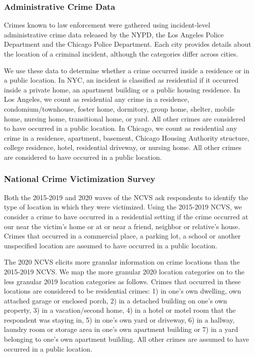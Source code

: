\subsubsection{Administrative Crime Data}
Crimes known to law enforcement were gathered using incident-level administrative crime data released by the NYPD, the Los Angeles Police Department and the Chicago Police Department. Each city provides details about the location of a criminal incident, although the categories differ across cities. 

We use these data to determine whether a crime occurred inside a residence or in a public location.  In NYC, an incident is classified as residential if it occurred inside a private home, an apartment building or a public housing residence. In Los Angeles, we count as residential any crime in a residence, condomium/townhouse, foster home, dormitory, group home, shelter, mobile home, nursing home, transitional home, or yard. All other crimes are considered to have occurred in a public location. In Chicago, we count as residential any crime in a residence, apartment, basement, Chicago Housing Authority structure, college residence, hotel, residential driveway, or nursing home. All other crimes are considered to have occurred in a public location. 

\subsubsection{National Crime Victimization Survey}
Both the 2015-2019 and 2020 waves of the NCVS ask respondents to identify the type of location in which they were victimized. Using the 2015-2019 NCVS, we consider a crime to have occurred in a residential setting if the crime occurred at our near the victim's home or at or near a friend, neighbor or relative's house. Crimes that occurred in a commercial place, a parking lot, a school or another unspecified location are assumed to have occurred in a public location. 

The 2020 NCVS elicits more granular information on crime locations than the 2015-2019 NCVS.  We map the more granular 2020 location categories on to the less granular 2019 location categories as follows. Crimes that occurred in these locations are considered to be residential crimes: 1) in one's own dwelling, own attached garage or enclosed porch, 2) in a detached building on one's own property, 3) in a vacation/second home, 4) in a hotel or motel room that the respondent was staying in, 5) in one's own yard or driveway, 6) in a hallway, laundry room or storage area in one's own apartment building or 7) in a yard belonging to one's own apartment building. All other crimes are assumed to have occurred in a public location.

